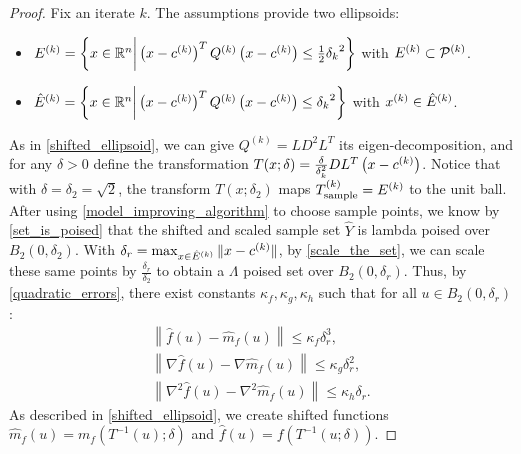 \begin{proof}

Fix an iterate $k$.
The assumptions provide two ellipsoids:
\begin{itemize}
\item ${E^{(k)}} = \left\{x \in \mathbb R^n \bigg | \left(x - c^{(k)} \right)^T {Q^{(k)}} \left(x - c^{(k)}\right) \le \frac 1 2 {\delta_k}^2 \right\}$ with ${E^{(k)}} \subset {{\mathcal{P}}^{(k)}}$.
\item ${{\hat E}^{(k)}} = \left\{x \in \mathbb R^n \bigg | \left(x - c^{(k)}\right)^T {Q^{(k)}} \left(x - c^{(k)}\right) \le {\delta_k}^2 \right\}$ with $x^{(k)} \in {{\hat E}^{(k)}}$.
\end{itemize}
As in \cref{shifted_ellipsoid}, we can give $Q^{(k)} = LD^2L^T$ its eigen-decomposition, 
and for any $\delta > 0$ define the transformation $T(x; \delta) = \frac{\delta}{\delta_k^2} D L^T\left(x - c^{(k)}\right)$.
Notice that with $\delta = \delta_2 = \sqrt{2}$,
the transform $T\left(x; \delta_2\right)$ maps ${T_{\text{sample}}^{(k)}} = {E^{(k)}}$ to the unit ball.
After using \cref{model_improving_algorithm} to choose sample points, we know by \cref{set_is_poised}
that the shifted and scaled sample set $\hat Y$ is lambda poised over $B_2(0, \delta_2)$.
With $\delta_r = \max_{x \in {{\hat E}^{(k)}}}\|x - c^{(k)}\|$, by \cref{scale_the_set},
we can scale these same points by $\frac{\delta_r}{\delta_2}$ to obtain a $\Lambda$ poised set over $B_2(0, \delta_r)$.
Thus, by \cref{quadratic_errors}, there exist constants $\kappa_f, \kappa_g, \kappa_h$ such that for all $u \in B_2(0, \delta_r)$:
\begin{align*}
\left\| \hat {f}\left(u\right) - \hat{m}_f\left(u\right) \right\|\le \kappa_f \delta_r^3, \\
\left\|\nabla \hat {f}\left(u\right) - \nabla \hat{m}_f\left(u\right) \right\|\le \kappa_g \delta_r^2, \\
\left\|\nabla^2 \hat {f}\left(u\right) - \nabla^2 \hat{m}_f\left(u\right) \right\|\le \kappa_h \delta_r.
\end{align*}
As described in \cref{shifted_ellipsoid}, we create shifted functions
$\hat {m}_f(u) = m_f(T^{-1}(u); \delta)$ and
$\hat f (u) = f(T^{-1}(u; \delta))$.



\end{proof}

